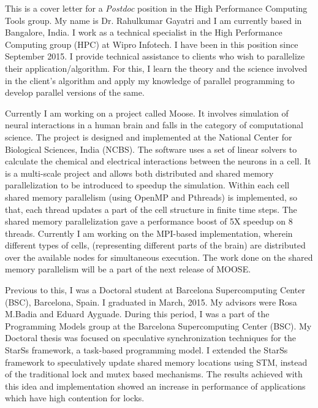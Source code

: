 \documentclass[10pt,stdletter,dateno]{newlfm}
\begin{document}
\begin{newlfm}
	   This is a cover letter for a {\it Postdoc} position in the High Performance Computing Tools group. 
	   My name is Dr. Rahulkumar Gayatri and I am currently based in Bangalore, India. 
	   I work as a technical specialist in the High Performance Computing group (HPC) at Wipro Infotech. 
	   I have been in this position since September 2015. 
	   I provide technical assistance to clients who wish to parallelize their application/algorithm.
	   For this, I learn the theory and the science involved in the client's algorithm and apply my knowledge of parallel programming to develop parallel versions of the same.
%	   
	   \par
	   Currently I am working on a project called Moose. It involves simulation of neural interactions in a human brain and falls in the category of computational science. 
	   The project is designed and implemented at the National Center for Biological Sciences, India (NCBS). 
	   The software uses a set of linear solvers to calculate the chemical and electrical interactions between the neurons in a cell. 
	   It is a multi-scale project and allows both distributed and shared memory parallelization to be introduced to speedup the simulation. 
	   Within each cell shared memory parallelism (using OpenMP and Pthreads) is implemented, so that, each thread updates a part of the cell structure in finite time steps.
	   The shared memory parallelization gave a performance boost of 5X speedup on 8 threads. 
	   Currently I am working on the MPI-based implementation, wherein different types of cells, (representing different parts of the brain) are distributed over the available nodes for simultaneous execution. 
	   The work done on the shared memory parallelism will be a part of the next release of MOOSE.
%	   
	   \par
	   Previous to this, I was a Doctoral student at Barcelona Supercomputing Center (BSC), Barcelona, Spain. I graduated in March, 2015. 
	   My advisors were Rosa M.Badia and Eduard Ayguade.  
	   During this period, I was a part of the Programming Models group at the Barcelona Supercomputing Center (BSC). 
	   My Doctoral thesis was focused on speculative synchronization techniques for the StarSs framework, a task-based programming model.
	   I extended the StarSs framework to speculatively update shared memory locations using STM, instead of the traditional lock and mutex based mechanisms.
	   The results achieved with this idea and implementation showed an increase in performance of applications which have high contention for locks. 

\end{newlfm}
\end{document}
